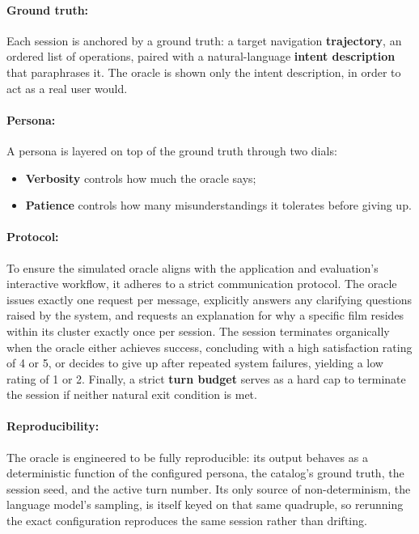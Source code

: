 \paragraph{Ground truth:} Each session is anchored by a ground truth: a target navigation \textbf{trajectory}, an ordered list of operations, paired with a natural-language \textbf{intent description} that paraphrases it.
The oracle is shown only the intent description, in order to act as a real user would.

\paragraph{Persona:} A persona is layered on top of the ground truth through two dials:
\begin{itemize}[leftmargin=1.4em]
  \item \textbf{Verbosity} controls how much the oracle says;
  \item \textbf{Patience} controls how many misunderstandings it tolerates before giving up.
\end{itemize}

\paragraph{Protocol:} To ensure the simulated oracle aligns with the application and evaluation's interactive workflow, it adheres to a strict communication protocol.
The oracle issues exactly one request per message, explicitly answers any clarifying questions raised by the system, and requests an explanation for why a specific film resides within its cluster exactly once per session.
The session terminates organically when the oracle either achieves success, concluding with a high satisfaction rating of 4 or 5, or decides to give up after repeated system failures, yielding a low rating of 1 or 2.
Finally, a strict \textbf{turn budget} serves as a hard cap to terminate the session if neither natural exit condition is met.

\paragraph{Reproducibility:} The oracle is engineered to be fully reproducible: its output behaves as a deterministic function of the configured persona, the catalog's ground truth, the session seed, and the active turn number.
Its only source of non-determinism, the language model's sampling, is itself keyed on that same quadruple, so rerunning the exact configuration reproduces the same session rather than drifting.

